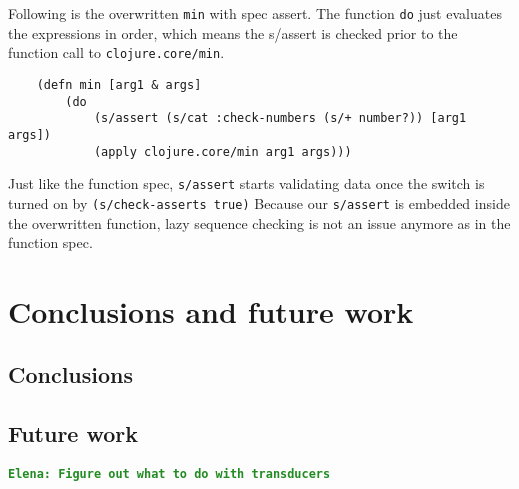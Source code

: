 \documentclass[12pt]{article}
\newcommand{\comment}[1]{{\bf \tt  {#1}}}
\newcommand{\emcomment}[1]{\textcolor{ForestGreen}{\comment{Elena: {#1}}}}
\begin{document}
	Following is the overwritten {\tt min} with spec assert. The function {\tt do} just evaluates
	the expressions in order, which means the s/assert is checked prior to the function call to {\tt clojure.core/min}.
	\begin{verbatim}
	(defn min [arg1 & args]
  		(do 
    		(s/assert (s/cat :check-numbers (s/+ number?)) [arg1 args])
    		(apply clojure.core/min arg1 args)))
	\end{verbatim} 
	Just like the function spec, {\tt s/assert} starts validating data once the switch is turned on by {\tt (s/check-asserts true)}
	Because our {\tt s/assert} is embedded inside the overwritten function, lazy sequence checking is not
	an issue anymore as in the function spec.
	
	
	
	

\section{Conclusions and future work}
	\subsection{Conclusions}
	\subsection{Future work}
\emcomment{Figure out what to do with transducers}
	


\end{document}
